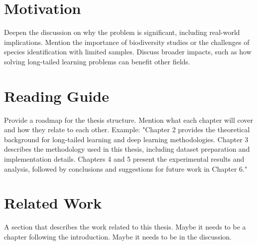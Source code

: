 \section{Motivation}
Deepen the discussion on why the problem is significant, including real-world implications.
Mention the importance of biodiversity studies or the challenges of species identification with limited samples.
Discuss broader impacts, such as how solving long-tailed learning problems can benefit other fields.

\section{Reading Guide}
Provide a roadmap for the thesis structure.
Mention what each chapter will cover and how they relate to each other.
Example: "Chapter 2 provides the theoretical background for long-tailed learning and deep learning methodologies. Chapter 3 describes the methodology used in this thesis, including dataset preparation and implementation details. Chapters 4 and 5 present the experimental results and analysis, followed by conclusions and suggestions for future work in Chapter 6."

\section{Related Work}

A section that describes the work related to this thesis. Maybe it needs to be a chapter following the introduction. Maybe it needs to be in the discussion.
